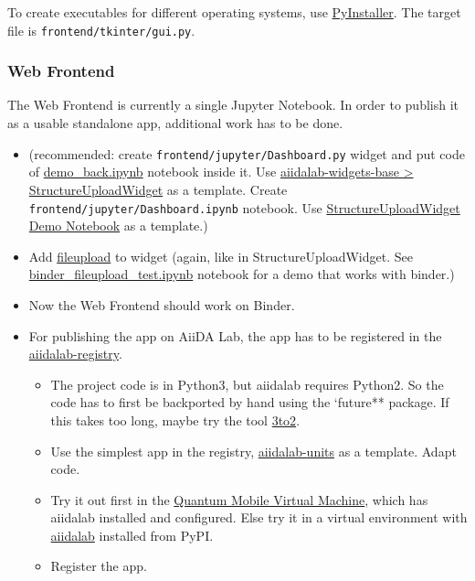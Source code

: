 \documentclass[]{article}
\providecommand{\tightlist}{%
  \setlength{\itemsep}{0pt}\setlength{\parskip}{0pt}}
\begin{document}
To create executables for different operating systems, use
\href{https://www.pyinstaller.org/}{PyInstaller}. The target file is
\texttt{frontend/tkinter/gui.py}.

\subsubsection{Web Frontend}\label{web-frontend-1}

The Web Frontend is currently a single Jupyter Notebook. In order to
publish it as a usable standalone app, additional work has to be done.

\begin{itemize}
\tightlist
\item
  (recommended: create \texttt{frontend/jupyter/Dashboard.py} widget and
  put code of
  \href{./frontend/jupyter/demo/demo_backend.ipynb}{demo\_back.ipynb}
  notebook inside it. Use
  \href{https://github.com/aiidalab/aiidalab-widgets-base/blob/master/aiidalab_widgets_base/structures.py}{aiidalab-widgets-base
  \textgreater{} StructureUploadWidget} as a template. Create
  \texttt{frontend/jupyter/Dashboard.ipynb} notebook. Use
  \href{https://github.com/aiidalab/aiidalab-widgets-base/blob/master/structures.ipynb}{StructureUploadWidget
  Demo Notebook} as a template.)
\item
  Add \href{https://pypi.org/project/fileupload/}{fileupload} to widget
  (again, like in StructureUploadWidget. See
  \href{./frontend/jupyter/demo/binder_fileupload_test.ipynb}{binder\_fileupload\_test.ipynb}
  notebook for a demo that works with binder.)
\item
  Now the Web Frontend should work on Binder.
\item
  For publishing the app on AiiDA Lab, the app has to be registered in
  the
  \href{https://github.com/aiidalab/aiidalab-registry}{aiidalab-registry}.

  \begin{itemize}
  \tightlist
  \item
    The project code is in Python3, but aiidalab requires Python2. So
    the code has to first be backported by hand using the `future**
    package. If this takes too long, maybe try the tool
    \href{https://pypi.org/project/3to2/}{3to2}.
  \item
    Use the simplest app in the registry,
    \href{https://github.com/aiidalab/aiidalab-units}{aiidalab-units} as
    a template. Adapt code.
  \item
    Try it out first in the
    \href{https://www.materialscloud.org/work/quantum-mobile}{Quantum
    Mobile Virtual Machine}, which has aiidalab installed and
    configured. Else try it in a virtual environment with
    \href{https://pypi.org/project/aiidalab/}{aiidalab} installed from
    PyPI.
  \item
    Register the app.
  \end{itemize}
\end{itemize}
\end{document}
